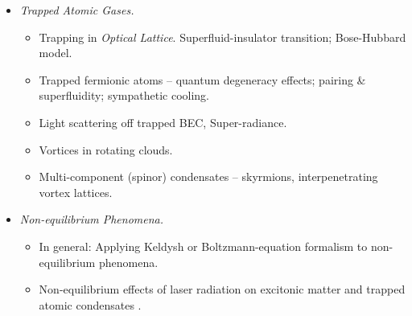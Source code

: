 \documentclass[12pt]{article}
\begin{document}
\begin{itemize}
\item {\large \it Trapped Atomic Gases.}
\begin{itemize}
\addtolength{\itemsep}{-\itemsep}   
\item Trapping in \emph{Optical Lattice}.  Superfluid-insulator
transition; Bose-Hubbard model.
\item Trapped fermionic atoms -- quantum degeneracy effects; pairing
\& superfluidity; sympathetic cooling.
\item Light scattering off trapped BEC, Super-radiance.  
\item Vortices in rotating clouds.
\item Multi-component (spinor) condensates --  skyrmions,
interpenetrating vortex lattices.
\end{itemize}


\item {\large \it  Non-equilibrium Phenomena.} 
\begin{itemize}
\addtolength{\itemsep}{-\itemsep}   
\item In general: Applying Keldysh or
Boltzmann-equation formalism to non-equilibrium phenomena.
\item Non-equilibrium effects of laser radiation on excitonic
matter and trapped atomic condensates .
\end{itemize}






\end{itemize}
\end{document}
